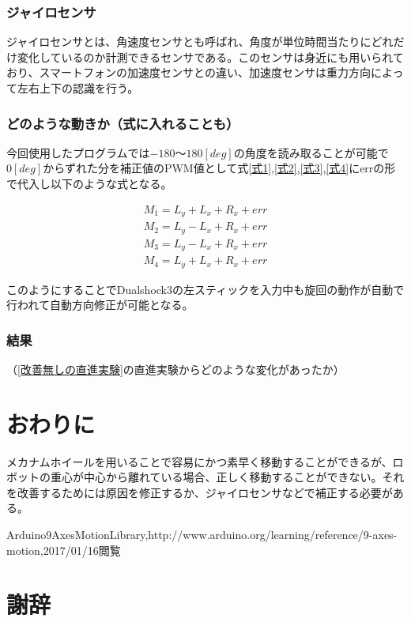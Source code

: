 \documentclass[12pt,oneside]{sotsuken_paper}
\begin{document}
		\subsection{ジャイロセンサ}
		ジャイロセンサとは、角速度センサとも呼ばれ、角度が単位時間当たりにどれだけ変化しているのか計測できるセンサである。このセンサは身近にも用いられており、スマートフォンの加速度センサとの違い、加速度センサは重力方向によって左右上下の認識を行う。

		\subsection{どのような動きか（式に入れることも）}
		今回使用したプログラムでは$-180～180[deg]$の角度を読み取ることが可能で$0[deg]$からずれた分を補正値のPWM値として式\ref{式1},\ref{式2},\ref{式3},\ref{式4}にerrの形で代入し以下のような式となる。

\begin{eqnarray}
M_1 = L_y + L_x + R_x + err
\\
M_2 = L_y - L_x + R_x + err
\\
M_3 = L_y - L_x + R_x + err
\\
M_4 = L_y + L_x + R_x + err
\end{eqnarray}

このようにすることでDualshock3の左スティックを入力中も旋回の動作が自動で行われて自動方向修正が可能となる。

		\subsection{結果}
		（\ref{改善無しの直進実験}の直進実験からどのような変化があったか）

\chapter{おわりに}
メカナムホイールを用いることで容易にかつ素早く移動することができるが、ロボットの重心が中心から離れている場合、正しく移動することができない。それを改善するためには原因を修正するか、ジャイロセンサなどで補正する必要がある。

\begin{thebibliography}{1}
 Arduino9AxesMotionLibrary,http:{\slash}{\slash}www.arduino.org{\slash}learning{\slash}reference{\slash}9-axes-motion,2017{\slash}01{\slash}16閲覧
\end{thebibliography}

\chapter*{謝辞}


\end{document}
